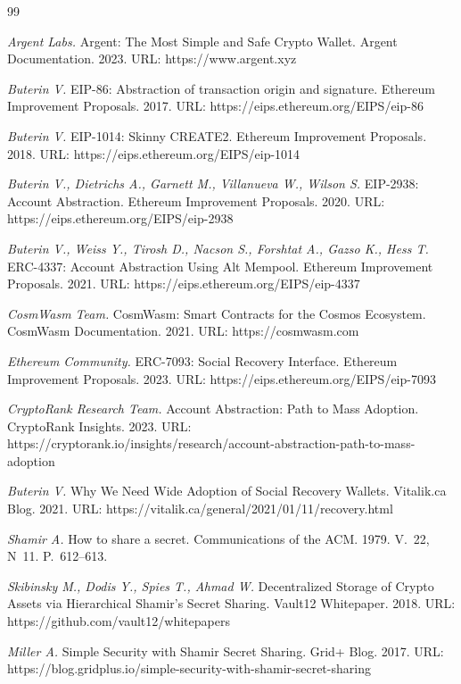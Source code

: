 \begin{thebibliography}{99}

 \textit{Argent Labs.} Argent: The Most Simple and Safe Crypto Wallet. Argent Documentation. 2023. URL: https://www.argent.xyz

 \textit{Buterin V.} EIP-86: Abstraction of transaction origin and signature. Ethereum Improvement Proposals. 2017. URL: https://eips.ethereum.org/EIPS/eip-86

 \textit{Buterin V.} EIP-1014: Skinny CREATE2. Ethereum Improvement Proposals. 2018. URL: https://eips.ethereum.org/EIPS/eip-1014

 \textit{Buterin V., Dietrichs A., Garnett M., Villanueva W., Wilson S.} EIP-2938: Account Abstraction. Ethereum Improvement Proposals. 2020. URL: https://eips.ethereum.org/EIPS/eip-2938

 \textit{Buterin V., Weiss Y., Tirosh D., Nacson S., Forshtat A., Gazso K., Hess T.} ERC-4337: Account Abstraction Using Alt Mempool. Ethereum Improvement Proposals. 2021. URL: https://eips.ethereum.org/EIPS/eip-4337

 \textit{CosmWasm Team.} CosmWasm: Smart Contracts for the Cosmos Ecosystem. CosmWasm Documentation. 2021. URL: https://cosmwasm.com

 \textit{Ethereum Community.} ERC-7093: Social Recovery Interface. Ethereum Improvement Proposals. 2023. URL: https://eips.ethereum.org/EIPS/eip-7093

 \textit{CryptoRank Research Team.} Account Abstraction: Path to Mass Adoption. CryptoRank Insights. 2023. URL: https://cryptorank.io/insights/research/account-abstraction-path-to-mass-adoption

 \textit{Buterin V.} Why We Need Wide Adoption of Social Recovery Wallets. Vitalik.ca Blog. 2021. URL: https://vitalik.ca/general/2021/01/11/recovery.html

 \textit{Shamir A.} How to share a secret. Communications of the ACM. 1979. V.~22, N~11. P.~612--613.

 \textit{Skibinsky M., Dodis Y., Spies T., Ahmad W.} Decentralized Storage of Crypto Assets via Hierarchical Shamir's Secret Sharing. Vault12 Whitepaper. 2018. URL: https://github.com/vault12/whitepapers

 \textit{Miller A.} Simple Security with Shamir Secret Sharing. Grid+ Blog. 2017. URL: https://blog.gridplus.io/simple-security-with-shamir-secret-sharing


\end{thebibliography}
